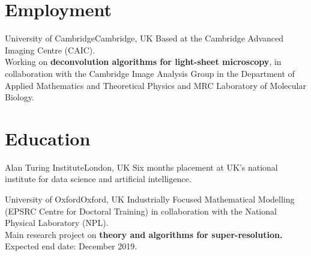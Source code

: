 \documentclass[11pt,a4paper,roman]{moderncv} %
\begin{document}


\section{Employment}

        {University of Cambridge}{Cambridge, UK}{}
        {
          Based at the Cambridge Advanced Imaging Centre (CAIC).\\
          Working on \textbf{deconvolution algorithms for light-sheet microscopy}, in collaboration
          with the Cambridge Image Analysis Group in the Department of Applied Mathematics and Theoretical Physics
          and MRC Laboratory of Molecular Biology.
        }

\section{Education}

        {Alan Turing Institute}{London, UK}{}
        {
          Six months placement at UK's national institute for
          data science and artificial intelligence.
        }

        {University of Oxford}{Oxford, UK}{}
        {
          Industrially Focused Mathematical Modelling 
          (EPSRC Centre for Doctoral Training) 
          in collaboration with the National Physical Laboratory (NPL). 
          \\
          Main research project on \textbf{theory and algorithms for super-resolution.}
          \\ 
          Expected end date: December 2019.
        }
\end{document}
